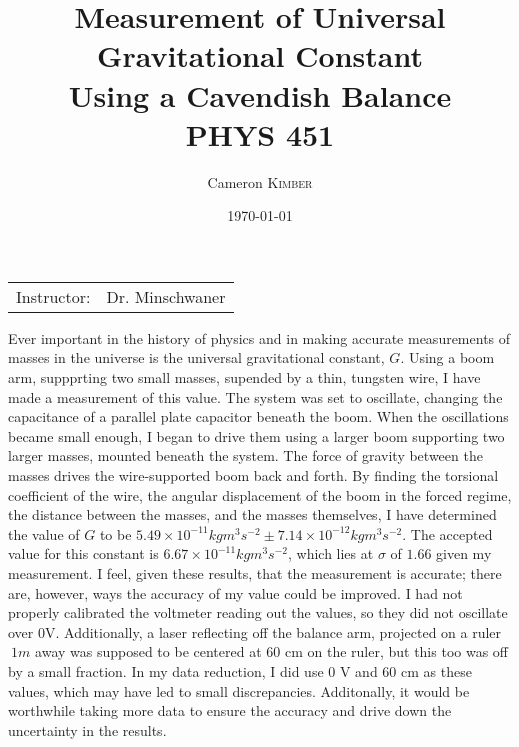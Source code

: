 \documentclass{article}
\title{Measurement of Universal Gravitational Constant \\ Using a Cavendish Balance \\ PHYS 451} %
\author{Cameron \textsc{Kimber}} %
\date{\today} %
\begin{document}
\maketitle %

\begin{center}
\begin{tabular}{l r}
Instructor: & Dr. Minschwaner %
\end{tabular}
\end{center}

\begin{abstract}

\end{abstract}
Ever important in the history of physics and in making accurate measurements of masses in the universe
is the universal gravitational constant, $G$. Using a boom arm, suppprting two small masses, supended by a thin, tungsten wire, I
have made a measurement of this value. The system was set to oscillate, changing the capacitance of a
parallel plate capacitor beneath the boom. When the oscillations became small enough, I began to drive them
using a larger boom supporting two larger masses, mounted beneath the system. The force of gravity between the
masses drives the wire-supported boom back and forth. By finding the torsional coefficient of the wire,
the angular displacement of the boom in the forced regime, the distance between the masses, and the masses themselves,
I have determined the value of $G$ to be $5.49 \times 10^{-11} kg m^{3} s^{-2} \pm 7.14 \times 10^{-12} kg m^{3} s^{-2}$.
The accepted value for this constant is $6.67 \times 10^{-11} kg m^{3} s^{-2}$, which lies at $\sigma$ of $1.66$ given
my measurement. I feel, given these results, that the measurement is accurate; there are, however, ways the accuracy of my
value could be improved. I had not properly calibrated the voltmeter reading out the values, so they did not oscillate over 0V.
Additionally, a laser reflecting off the balance arm, projected on a ruler $~1 m$ away was supposed to be centered at $60$ cm on the
ruler, but this too was off by a small fraction. In my data reduction, I did use 0 V and $60$ cm as these values, which may have led
to small discrepancies. Additonally, it would be worthwhile taking more data to ensure the accuracy and drive down the uncertainty in
the results.
\end{document}
